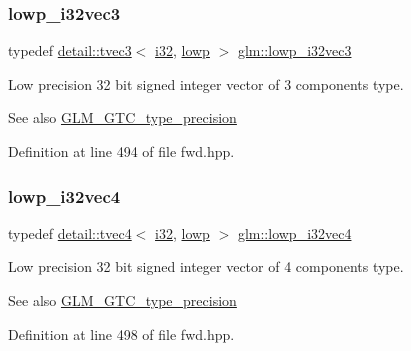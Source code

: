 \subsubsection{\texorpdfstring{lowp\+\_\+i32vec3}{lowp\_i32vec3}}
{\footnotesize\ttfamily typedef \hyperlink{structglm_1_1detail_1_1tvec3}{detail\+::tvec3}$<$ \hyperlink{group__gtc__type__precision_ga1d8ed5c43e91ea7d4528389da4fa9524}{i32}, \hyperlink{namespaceglm_a0f04f086094c747d227af4425893f545ae161af3fc695e696ce3bf69f7332bc2d}{lowp} $>$ \hyperlink{group__gtc__type__precision_gaa4a0dd64d4253a3641225254670c7b95}{glm\+::lowp\+\_\+i32vec3}}

Low precision 32 bit signed integer vector of 3 components type. \begin{DoxySeeAlso}{See also}
\hyperlink{group__gtc__type__precision}{G\+L\+M\+\_\+\+G\+T\+C\+\_\+type\+\_\+precision} 
\end{DoxySeeAlso}


Definition at line 494 of file fwd.\+hpp.

\mbox{\label{group__gtc__type__precision_ga99adefeda08a56345b0553d13283d2fa}} 
\subsubsection{\texorpdfstring{lowp\+\_\+i32vec4}{lowp\_i32vec4}}
{\footnotesize\ttfamily typedef \hyperlink{structglm_1_1detail_1_1tvec4}{detail\+::tvec4}$<$ \hyperlink{group__gtc__type__precision_ga1d8ed5c43e91ea7d4528389da4fa9524}{i32}, \hyperlink{namespaceglm_a0f04f086094c747d227af4425893f545ae161af3fc695e696ce3bf69f7332bc2d}{lowp} $>$ \hyperlink{group__gtc__type__precision_ga99adefeda08a56345b0553d13283d2fa}{glm\+::lowp\+\_\+i32vec4}}

Low precision 32 bit signed integer vector of 4 components type. \begin{DoxySeeAlso}{See also}
\hyperlink{group__gtc__type__precision}{G\+L\+M\+\_\+\+G\+T\+C\+\_\+type\+\_\+precision} 
\end{DoxySeeAlso}


Definition at line 498 of file fwd.\+hpp.

\mbox{\label{group__gtc__type__precision_ga1f4ded25f71c0f3b4518936d50b54b6e}} 
